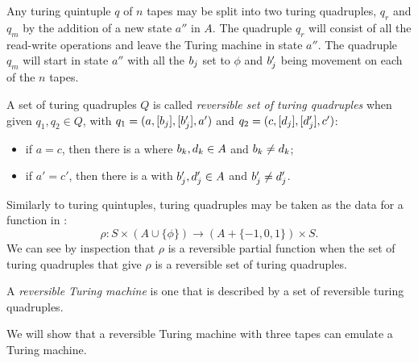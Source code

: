 \begin{remark}\label{rem:quintuple_to_quadruple}
  Any turing quintuple $q$ of $n$ tapes may be split into two turing quadruples, $q_r$ and $q_m$ by
  the addition of a new state $a''$ in $A$. The quadruple $q_r$ will consist of all the read-write
  operations and leave the Turing machine in state $a''$. The quadruple $q_m$ will start in state
  $a''$ with all the $b_j$ set to $\phi$ and $b'_j$ being movement on each of the $n$ tapes.
\end{remark}

\begin{definition}\label{def:reversible_turing_quadruple}
  A set of turing quadruples $Q$ is called \emph{reversible set of turing quadruples} when given
  $q_1,q_2\in Q$, with $q_1=(a,[b_j], [b'_j], a')$ and $q_2=(c,[d_j], [d'_j], c')$:
\begin{itemize}
  \item[\axiom{RTM}{1}] if $a=c$, then there is a \kay where $b_k, d_k \in A$ and $b_k \ne
    d_k$;
  \item[\axiom{RTM}{2}] if $a' = c'$, then there is a \jay with $b'_j, d'_j \in A$ and
    $b'_j \ne d'_j$.
\end{itemize}
\end{definition}

Similarly to turing quintuples, turing quadruples may be taken as the data for a function in \sets:
\[
  \rho:S\times(A  \cup \{\phi\}) \to (A  + \{-1,0,1\}) \times S.
\]
We can see by inspection that $\rho$ is a reversible partial function when the set of turing
quadruples that give $\rho$ is a reversible set of turing quadruples.

\begin{definition}\label{def:reversible_turing_machine}
  A \emph{reversible Turing machine} is one that is described by a set of reversible turing
  quadruples.
\end{definition}

We will show that a reversible Turing machine with three tapes can emulate a Turing machine.

